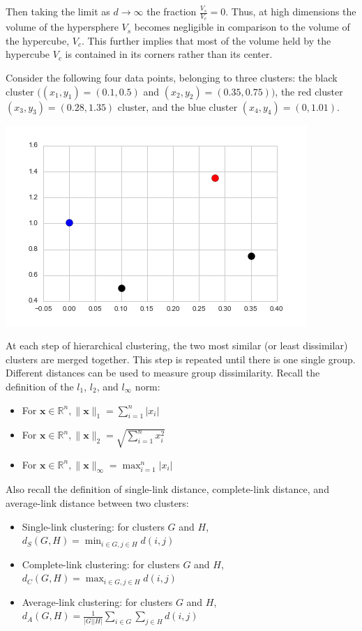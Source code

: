 \documentclass[submit]{harvardml}
\begin{document}
\noindent
Then taking the limit as $d \rightarrow \infty$ the fraction $\frac{V_s}{V_c} = 0$. Thus, at high dimensions the volume of the hypersphere $V_s$ becomes negligible in comparison to the volume of the hypercube, $V_c$. This further implies that most of the volume held by the hypercube $V_c$ is contained in its corners rather than its center.

\newpage
\begin{problem}

  Consider the following four data points, belonging to three clusters: the
  black cluster $((x_1, y_1) = (0.1, 0.5) $ and $(x_2, y_2) = (0.35, 0.75))$,
  the red cluster $(x_3, y_3) = (0.28, 1.35)$ cluster, and the blue cluster
  $(x_4, y_4) = (0, 1.01)$.

  \begin{center} \includegraphics[scale=.4]{scatterplot.png} \end{center}
  At each step of hierarchical clustering, the two most similar (or least
  dissimilar) clusters are merged together. This step is repeated until there is
  one single group. Different distances can be used to measure group
  dissimilarity. Recall the definition of the $l_1$, $l_2$, and $l_{\infty}$
  norm:
  \begin{itemize}
    \item For $\mathbf{x} \in \mathbb{R}^n, \| \mathbf{x} \|_1 = \sum_{i = 1}^n
      |x_i|$
    \item For $\mathbf{x} \in \mathbb{R}^n, \| \mathbf{x} \|_2 = \sqrt{\sum_{i =
      1}^n x_i^2 }$
    \item For $\mathbf{x} \in \mathbb{R}^n, \| \mathbf{x} \|_{\infty} = \max_{i
      = 1}^n |x_i|$
  \end{itemize}
  Also recall the definition of single-link distance, complete-link distance,
  and average-link distance between two clusters:
  \begin{itemize}
    \item Single-link clustering: for clusters $G$ and $H$, $d_{S}(G, H) =
    \min_{i \in G, j\in H} d(i, j)$
    \item Complete-link clustering: for clusters $G$ and $H$, $d_{C}(G, H) =
    \max_{i \in G, j\in H} d(i, j)$
    \item Average-link clustering: for clusters $G$ and $H$, $d_{A}(G, H) =
      \frac{1}{|G| |H|} \sum_{i\in G}\sum_{j \in H} d(i, j)$
  \end{itemize}

\end{problem}
\end{document}
